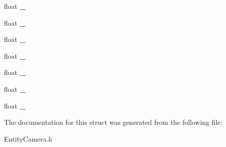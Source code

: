 \begin{DoxyCompactItemize}
\item 
\hypertarget{struct_view_matrix_a1ccf1eb259434e53e153bb010db56f1b}{float {\bfseries \-\_}}\label{struct_view_matrix_a1ccf1eb259434e53e153bb010db56f1b}

\item 
\hypertarget{struct_view_matrix_afceb262b1682a0c4db7d1f58a6abb7c7}{float {\bfseries \-\_}}\label{struct_view_matrix_afceb262b1682a0c4db7d1f58a6abb7c7}

\item 
\hypertarget{struct_view_matrix_a1db279bf1a44e228943413c98420a2f0}{float {\bfseries \-\_}}\label{struct_view_matrix_a1db279bf1a44e228943413c98420a2f0}

\item 
\hypertarget{struct_view_matrix_ae55d6ffe10c6bc2fc9e5dca41465192b}{float {\bfseries \-\_}}\label{struct_view_matrix_ae55d6ffe10c6bc2fc9e5dca41465192b}

\item 
\hypertarget{struct_view_matrix_acac4eac71501c23d67f581e470110ff0}{float {\bfseries \-\_}}\label{struct_view_matrix_acac4eac71501c23d67f581e470110ff0}

\item 
\hypertarget{struct_view_matrix_ac26595b6b3925b6ccfbff0bd17c7b28b}{float {\bfseries \-\_}}\label{struct_view_matrix_ac26595b6b3925b6ccfbff0bd17c7b28b}

\item 
\hypertarget{struct_view_matrix_a3514e621feebfa6f182fd5f98dbabcd4}{float {\bfseries \-\_}}\label{struct_view_matrix_a3514e621feebfa6f182fd5f98dbabcd4}

\end{DoxyCompactItemize}


The documentation for this struct was generated from the following file\-:\begin{DoxyCompactItemize}
\item 
Entity\-Camera.\-h\end{DoxyCompactItemize}
